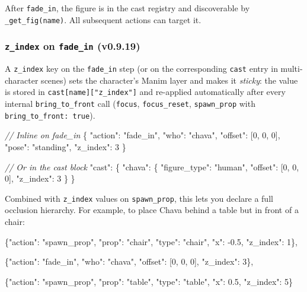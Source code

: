 \documentclass[
  11pt,
]{book}
\newenvironment{Shaded}{}{}
\newcommand{\CommentTok}[1]{\textcolor[rgb]{0.38,0.63,0.69}{\textit{#1}}}
\newcommand{\NormalTok}[1]{#1}
\begin{document}
After \texttt{fade\_in}, the figure is in the cast registry and
discoverable by \texttt{\_get\_fig(name)}. All subsequent actions can
target it.

\subsubsection{\texttt{z\_index} on \texttt{fade\_in} (v0.9.19)}\label{fade-in-z-index}

A \texttt{z\_index} key on the \texttt{fade\_in} step (or on the
corresponding \texttt{cast} entry in multi-character scenes) sets the
character's Manim layer and makes it \emph{sticky}: the value is stored
in \texttt{cast[name]["z\_index"]} and re-applied automatically after
every internal \texttt{bring\_to\_front} call (\texttt{focus},
\texttt{focus\_reset}, \texttt{spawn\_prop} with
\texttt{bring\_to\_front:\ true}).

\begin{Shaded}
\begin{Highlighting}[]
\CommentTok{// Inline on fade\_in}
\NormalTok{\{}
\NormalTok{  "action": "fade\_in",}
\NormalTok{  "who": "chava",}
\NormalTok{  "offset": [0, 0, 0],}
\NormalTok{  "pose": "standing",}
\NormalTok{  "z\_index": 3}
\NormalTok{\}}

\CommentTok{// Or in the cast block}
\NormalTok{"cast": \{}
\NormalTok{  "chava": \{}
\NormalTok{    "figure\_type": "human",}
\NormalTok{    "offset": [0, 0, 0],}
\NormalTok{    "z\_index": 3}
\NormalTok{  \}}
\NormalTok{\}}
\end{Highlighting}
\end{Shaded}

Combined with \texttt{z\_index} values on \texttt{spawn\_prop}, this
lets you declare a full occlusion hierarchy. For example, to place Chava
behind a table but in front of a chair:

\begin{Shaded}
\begin{Highlighting}[]
\NormalTok{\{"action": "spawn\_prop", "prop": "chair", "type": "chair",}
\NormalTok{ "x": -0.5, "z\_index": 1\},}

\NormalTok{\{"action": "fade\_in", "who": "chava", "offset": [0, 0, 0], "z\_index": 3\},}

\NormalTok{\{"action": "spawn\_prop", "prop": "table", "type": "table",}
\NormalTok{ "x": 0.5, "z\_index": 5\}}
\end{Highlighting}
\end{Shaded}
\end{document}
